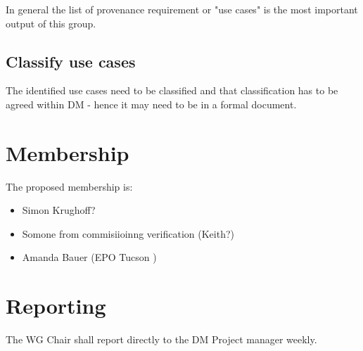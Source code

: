 In general the list of \gls{provenance} requirement or  "use cases"  is the most important output of this group.
\subsection{Classify use cases}
The identified use cases need to be classified and that classification has to be agreed within \gls{DM} - hence it may need to be in a formal document.



\section{Membership}

The proposed membership is:

\begin{itemize}
    \item Simon Krughoff?
    \item Somone from commisiioinng verification (Keith?)
    \item Amanda Bauer (\gls{EPO} Tucson )
\end{itemize}


\section{Reporting}

The \gls{WG} Chair shall report directly to the \gls{DM} Project manager weekly.
